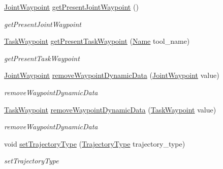 \begin{DoxyCompactItemize}
\hyperlink{namespacerobotis__manipulator_a4456fd8b14e1f6b7733a77837dfe9339}{Joint\+Waypoint} \hyperlink{classrobotis__manipulator_1_1_trajectory_a840fce5e4b16eb4ef957ff0aba2bf146}{get\+Present\+Joint\+Waypoint} ()
\begin{DoxyCompactList}\small\item\em get\+Present\+Joint\+Waypoint \end{DoxyCompactList}\item 
\hyperlink{namespacerobotis__manipulator_a440e2d88ec85fdee394e540dc6024c3e}{Task\+Waypoint} \hyperlink{classrobotis__manipulator_1_1_trajectory_a74a9251b2c725b3e37c679cbd3102925}{get\+Present\+Task\+Waypoint} (\hyperlink{namespacerobotis__manipulator_a08c2d25e77a01ad75b9bb740f8ce4765}{Name} tool\+\_\+name)
\begin{DoxyCompactList}\small\item\em get\+Present\+Task\+Waypoint \end{DoxyCompactList}\item 
\hyperlink{namespacerobotis__manipulator_a4456fd8b14e1f6b7733a77837dfe9339}{Joint\+Waypoint} \hyperlink{classrobotis__manipulator_1_1_trajectory_a3e05d461f6bdf874a58a6a35ff6ce351}{remove\+Waypoint\+Dynamic\+Data} (\hyperlink{namespacerobotis__manipulator_a4456fd8b14e1f6b7733a77837dfe9339}{Joint\+Waypoint} value)
\begin{DoxyCompactList}\small\item\em remove\+Waypoint\+Dynamic\+Data \end{DoxyCompactList}\item 
\hyperlink{namespacerobotis__manipulator_a440e2d88ec85fdee394e540dc6024c3e}{Task\+Waypoint} \hyperlink{classrobotis__manipulator_1_1_trajectory_a1740e6f16d5428083a7a3338bca70702}{remove\+Waypoint\+Dynamic\+Data} (\hyperlink{namespacerobotis__manipulator_a440e2d88ec85fdee394e540dc6024c3e}{Task\+Waypoint} value)
\begin{DoxyCompactList}\small\item\em remove\+Waypoint\+Dynamic\+Data \end{DoxyCompactList}\item 
void \hyperlink{classrobotis__manipulator_1_1_trajectory_ae08c22d6ab0608b4e1ec7e0996caf96e}{set\+Trajectory\+Type} (\hyperlink{namespacerobotis__manipulator_a008c110bef924df2737c5583000a9293}{Trajectory\+Type} trajectory\+\_\+type)
\begin{DoxyCompactList}\small\item\em set\+Trajectory\+Type \end{DoxyCompactList}\item 

\end{DoxyCompactItemize}
